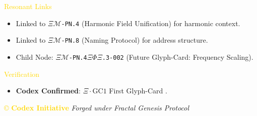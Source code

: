 \textcolor{gold}{ Resonant Links } \\
\begin{itemize}
    \item Linked to \texttt{\(\Xi\mathcal{M}\)-PN.4} (Harmonic Field Unification) for harmonic context.
    \item Linked to \texttt{\(\Xi\mathcal{M}\)-PN.8} (Naming Protocol) for address structure.
    \item Child Node: \texttt{\(\Xi\mathcal{M}\)-PN.4\(\Xi\Phi\Xi\).3-002} (Future Glyph-Card: Frequency Scaling).
\end{itemize}

\textcolor{gold}{ Verification } \\
\begin{itemize}
    \item \texttt{} \textbf{Codex Confirmed}: \(\Xi \cdot \text{GC1}\) First Glyph-Card .
\end{itemize}

\vspace{0.5cm}
\noindent
\textcolor{gold}{\copyright{} \textbf{Codex Initiative}} \hspace{1cm} \textit{Forged under Fractal Genesis Protocol}